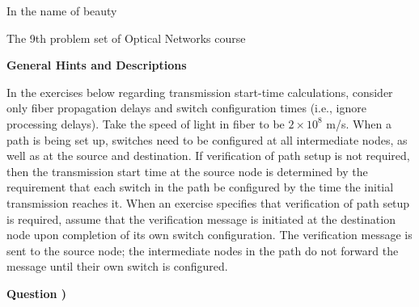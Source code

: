 \documentclass[a4paper]{article}
\newcounter{QuestionNumber}
\newcommand{\Q}{
\textbf{Question \theQuestionNumber)}
\stepcounter{QuestionNumber}
}
\begin{document}
\Large
\begin{center}
In the name of beauty

The 9th problem set of Optical Networks course

\hrulefill
\end{center}

\textbf{General Hints and Descriptions}

In the exercises below regarding transmission start-time calculations, consider only
fiber propagation delays and switch configuration times (i.e., ignore processing
delays). Take the speed of light in fiber to be $2 \times 10^8$ m/s. When a path is being set
up, switches need to be configured at all intermediate nodes, as well as at the source
and destination. If verification of path setup is not required, then the transmission
start time at the source node is determined by the requirement that each switch in
the path be configured by the time the initial transmission reaches it.
When an exercise specifies that verification of path setup is required, assume that
the verification message is initiated at the destination node upon completion of its
own switch configuration. The verification message is sent to the source node; the
intermediate nodes in the path do not forward the message until their own switch
is configured.

\Q
\end{document}
